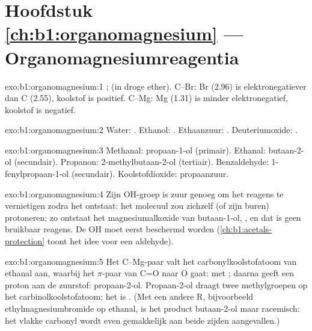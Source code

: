 \section*{Hoofdstuk \ref{ch:b1:organomagnesium} --- Organomagnesiumreagentia}

\begin{solution}{exo:b1:organomagnesium:1}
;  (in droge
ether). C--Br: Br (2.96) is elektronegatiever dan C (2.55), koolstof is
positief. C--Mg: Mg (1.31) is minder elektronegatief, koolstof is
negatief.
\end{solution}

\begin{solution}{exo:b1:organomagnesium:2}
Water: .
Ethanol: .
Ethaanzuur: .
Deuteriumoxide: .
\end{solution}

\begin{solution}{exo:b1:organomagnesium:3}
Methanal: propaan-1-ol (primair). Ethanal: butaan-2-ol (secundair).
Propanon: 2-methylbutaan-2-ol (tertiair). Benzaldehyde:
1-fenylpropaan-1-ol (secundair). Koolstofdioxide: propaanzuur.
\end{solution}

\begin{solution}{exo:b1:organomagnesium:4}
Zijn OH-groep is zuur genoeg om het reagens te vernietigen zodra het
ontstaat: het molecuul zou zichzelf (of zijn buren) protoneren; zo
ontstaat het magnesium\-alkoxide van butaan-1-ol, , en
dat is geen bruikbaar reagens. De OH moet eerst beschermd worden
(\cref{ch:b1:acetals-protection} toont het idee voor een aldehyde).
\end{solution}

\begin{solution}{exo:b1:organomagnesium:5}
Het C--Mg-paar valt het carbonylkoolstofatoom van ethanal aan, waarbij het
$\pi$-paar van C=O naar O gaat:  met ; daarna
geeft  een proton aan de zuurstof: propaan-2-ol. Propaan-2-ol
draagt twee methylgroepen op het carbinolkoolstofatoom: het is .
(Met een andere R, bijvoorbeeld ethylmagnesiumbromide op ethanal, is het
product butaan-2-ol  maar racemisch: het vlakke carbonyl wordt even
gemakkelijk aan beide zijden aangevallen.)
\end{solution}

